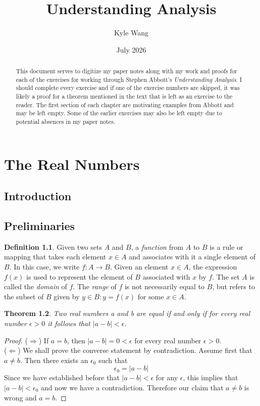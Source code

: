 \documentclass[12pt,letterpaper]{report}
\title{Understanding Analysis}
\author{Kyle Wang}
\date{July 2026}
\newtheorem{theorem}{Theorem}[section]
\theoremstyle{definition}
\newtheorem{definition}[theorem]{Definition}
\theoremstyle{remark}
\begin{document}
\maketitle
\newpage
\begin{abstract}
This document serves to digitize my paper notes along with my work and proofs for each of the exercises for working through Stephen Abbott's \textit{Understanding Analysis}. I should complete every exercise and if one of the exercise numbers are skipped, it was likely a proof for a theorem mentioned in the text that is left as an exercise to the reader. The first section of each chapter are motivating examples from Abbott and may be left empty. Some of the earlier exercises may also be left empty due to potential absences in my paper notes.
\end{abstract}
\newpage

\chapter{The Real Numbers}

\section{Introduction}
\section{Preliminaries}
\begin{definition}
Given two sets $A$ and $B$, a \textit{function} from $A$ to $B$ is a rule or mapping that takes each element $x \in A$ and associates with it a single element of $B$. In this case, we write $f:A \rightarrow B$. Given an element $x \in A$, the expression $f(x)$ is used to represent the element of $B$ associated with $x$ by $f$. The set $A$ is called the \textit{domain} of $f$. The \textit{range} of $f$ is not necessarily equal to $B$, but refers to the subset of $B$ given by ${y \in B:y=f(x) \text{ for some } x \in A}$.
\end{definition}

\begin{flushleft}
\begin{theorem}
Two real numbers a and b are equal if and only if for every real number $\epsilon > 0$ it follows that $|a-b|<\epsilon$.
\end{theorem}
\end{flushleft}
\begin{proof}
    ($\Rightarrow$) If $a=b$, then $|a-b| = 0 < \epsilon$ for every real number $\epsilon > 0$.\\
    ($\Leftarrow$) We shall prove the converse statement by contradiction. Assume first that $a \neq b$. Then there exists an $\epsilon_0$ such that
\begin{equation*}
    \epsilon_0 = |a-b|
\end{equation*}
Since we have established before that $|a-b| < \epsilon$ for any $\epsilon$, this implies that $|a-b| < \epsilon_0$ and now we have a contradiction. Therefore our claim that $a \neq b$ is wrong and $a=b$.
\end{proof}
\end{document}
